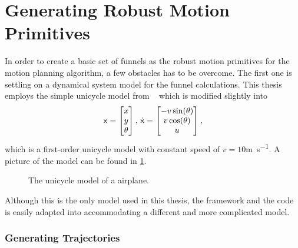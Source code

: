 \section{Generating Robust Motion Primitives}
\label{sec:generating-robust-motion-primitives}

In order to create a basic set of funnels as the robust motion primitives for
the \rrtfunnel{} motion planning algorithm, a few obstacles has to be overcome.
The first one is settling on a dynamical system model for the funnel
calculations. This thesis employs the simple unicycle model from
\citeauthor{Lav06}~\cite[613]{Lav06} which is modified slightly into
\begin{equation}
  \label{eq:model-dynamics}
  {\mathbf{\mathsf{x}}} =
  \begin{bmatrix}
    x \\ y \\ \theta \\
  \end{bmatrix}, \, \dot{{\mathbf{\mathsf{x}}}} =
  \begin{bmatrix}
    -v \sin(\theta) \\
    v \cos(\theta) \\
    u \\
  \end{bmatrix}
  ,
\end{equation}
which is a first-order unicycle model with constant speed of
\(v=10\)\si{m.s^{-1}}. A picture of the model can be found in
\cref{fig:second-order-unicycle}.
\begin{figure}
  \caption{The unicycle model of a airplane.}
  \label{fig:second-order-unicycle}
\end{figure}
Although this is the only model used in this thesis, the framework and the code
is easily adapted into accommodating a different and more complicated model.

\subsubsection{Generating Trajectories}
\label{subsec:generating-the-trajectories}


